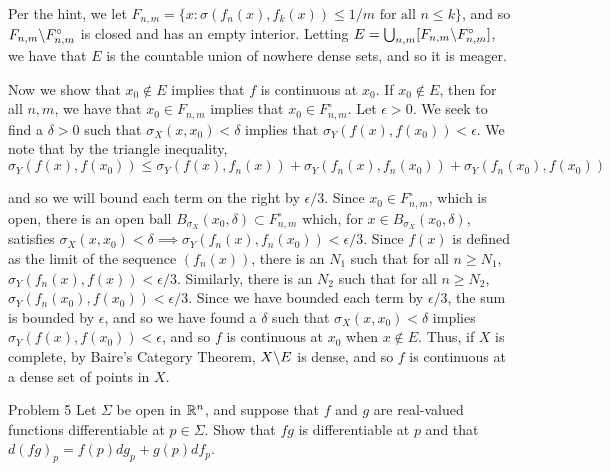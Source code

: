 \documentclass{hmwk}
\begin{document}
\begin{solution}

\pre Per the hint, we let $F_{n, m} = \{x : \sigma(f_n(x), f_k(x)) \leq 1/m \text{ for all } n \leq k\}$, and so $F_{n, m}\backslash F_{n, m}^\circ$ is closed and has an empty interior. Letting $E = \bigcup_{n, m} [F_{n, m}\backslash F_{n, m}^\circ]$, we have that $E$ is the countable union of nowhere dense sets, and so it is meager. 

\pre Now we show that $x_0 \notin E$ implies that $f$ is continuous at $x_0$. If $x_0 \notin E$, then for all $n, m$, we have that $x_0 \in F_{n, m}$ implies that $x_0 \in F_{n, m}^\circ$. Let $\epsilon > 0$. We seek to find a $\delta > 0$ such that $\sigma_X(x, x_0) < \delta$ implies that $\sigma_Y(f(x), f(x_0)) < \epsilon$. We note that by the triangle inequality,
$$\sigma_Y(f(x), f(x_0)) \leq \sigma_Y(f(x), f_n(x)) + \sigma_Y(f_n(x), f_n(x_0)) + \sigma_Y(f_n(x_0), f(x_0))$$

\pre and so we will bound each term on the right by $\epsilon/3$. Since $x_0 \in F_{n, m}^\circ$, which is open, there is an open ball $B_{\sigma_X}(x_0, \delta) \subset F_{n, m}^\circ$ which, for $x \in B_{\sigma_X}(x_0, \delta)$, satisfies  $\sigma_X(x, x_0) < \delta \implies \sigma_Y(f_n(x), f_n(x_0)) < \epsilon/3$. Since $f(x)$ is defined as the limit of the sequence $(f_n(x))$, there is an $N_1$ such that for all $n \geq N_1$, $\sigma_Y(f_n(x), f(x)) < \epsilon/3$. Similarly, there is an $N_2$ such that for all $n \geq N_2$, $\sigma_Y(f_n(x_0), f(x_0)) < \epsilon/3$. Since we have bounded each term by $\epsilon/3$, the sum is bounded by $\epsilon$, and so we have found a $\delta$ such that $\sigma_X(x, x_0) < \delta$ implies $\sigma_Y(f(x), f(x_0)) < \epsilon$, and so $f$ is continuous at $x_0$ when $x \notin E$. Thus, if $X$ is complete, by Baire's Category Theorem, $X\backslash E$ is dense, and so $f$ is continuous at a dense set of points in $X$.

\end{solution}

\begin{problem}{Problem 5}
Let $\Sigma$ be open in $\mathbb{R}^n$, and suppose that $f$ and $g$ are real-valued functions differentiable at $p \in \Sigma$. Show that $fg$ is differentiable at $p$ and that $d(fg)_p = f(p)dg_p + g(p)df_p$.
\end{problem}
\end{document}
